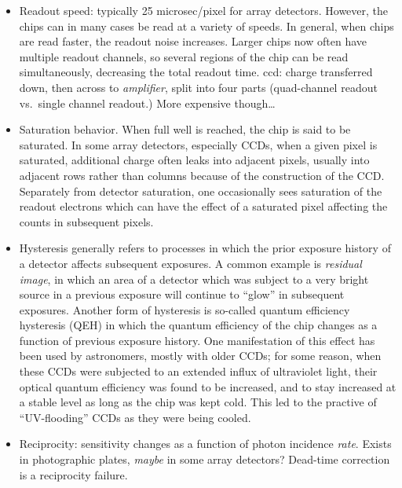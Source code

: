 \documentclass[12pt]{article}
\newcommand{\mynotes}[1]{\textcolor{myBlue}{#1}}
\begin{document}
\begin{itemize}
    \item Readout speed: typically 25 microsec/pixel for array detectors.
        However, the chips can in many cases be read at a variety of speeds. In
        general, when chips are read faster, the readout noise increases.
        Larger chips now often have multiple readout channels, so several
        regions of the chip can be read simultaneously, decreasing the total
        readout time.
        \mynotes{ccd: charge transferred down, then across to \emph{amplifier},
        split into four parts (quad-channel readout vs.\ single channel
        readout.) More expensive though\ldots}
    \item Saturation behavior. When full well is reached, the chip is
        said to be saturated. In some array detectors, especially
        CCDs, when a given pixel is saturated, additional charge often
        leaks into adjacent pixels, usually into adjacent rows rather
        than columns because of the construction of the CCD\@.
        Separately from detector saturation, one occasionally sees
        saturation of the readout electrons which can have the effect
        of a saturated pixel affecting the counts in subsequent
        pixels.
    \item Hysteresis generally refers to processes in which the prior
        exposure history of a detector affects subsequent exposures. A
        common example is \emph{residual image}, in which an area of a
        detector which was subject to a very bright source in a
        previous exposure will continue to ``glow'' in subsequent
        exposures. Another form of hysteresis is so-called quantum
        efficiency hysteresis (QEH) in which the quantum efficiency of
        the chip changes as a function of previous exposure history.
        One manifestation of this effect has been used by astronomers,
        mostly with older CCDs; for some reason, when these CCDs were
        subjected to an extended influx of ultraviolet light, their
        optical quantum efficiency was found to be increased, and to
        stay increased at a stable level as long as the chip was kept
        cold. This led to the practive of ``UV-flooding'' CCDs as they
        were being cooled.
    \item Reciprocity: sensitivity changes as a function of photon
        incidence \emph{rate}. Exists in photographic plates,
        \emph{maybe} in some
        array detectors? Dead-time correction is a reciprocity
        failure.
\end{itemize}
\end{document}
